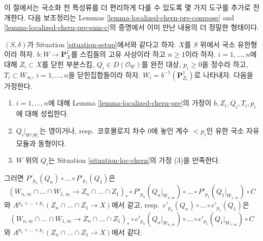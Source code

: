 \noindent
이 절에서는 국소화 천 특성류를 더 편리하게 다룰 수 있도록 몇 가지
도구를 추가로 전개한다. 다음 보조정리는 Lemmas
\ref{lemma-localized-chern-pre-compose} and
\ref{lemma-localized-chern-pre-sum-c}의 증명에서 이미 만난 내용의 더
정밀한 형태이다.

\begin{lemma}
\label{lemma-homomorphism-final}
$(S, \delta)$가 Situation \ref{situation-setup}에서와 같다고 하자.
$X$를 $S$ 위에서 국소 유한형이라 하자. $b : W \longrightarrow \mathbf{P}^1_X$를
스킴들의 고유 사상이라 하고 $n \geq 1$이라 하자.
$i = 1, \ldots, n$에 대해 $Z_i \subset X$를 닫힌 부분스킴,
$Q_i \in D(\mathcal{O}_W)$를 완전 대상, $p_i \geq 0$을 정수라 하고,
$T_i \subset W_\infty$, $i = 1, \ldots, n$을 닫힌집합들이라 하자.
$W_i = b^{-1}(\mathbf{P}^1_{Z_i})$로 나타내자. 다음을 가정한다.
\begin{enumerate}
\item $i = 1, \ldots, n$에 대해 Lemma
\ref{lemma-localized-chern-pre}의 가정이 $b, Z_i, Q_i, T_i, p_i$에 대해
성립한다.
\item $Q_i|_{W \setminus W_i}$는 영이거나, resp.\ 코호몰로지 차수 $0$에
놓인 계수 $< p_i$인 유한 국소 자유 모듈과 동형이다.
\item $W$ 위의 $Q_i$는 Situation \ref{situation-loc-chern}의 가정 (3)을
만족한다.
\end{enumerate}
그러면 $P'_{p_n}(Q_n) \circ \ldots \circ P'_{p_1}(Q_1)$은
$$
(W_{n, \infty} \cap \ldots \cap W_{1, \infty} \to
Z_n \cap \ldots \cap Z_1)_* \circ
P'_{p_n}(Q_n|_{W_{n, \infty}}) \circ \ldots \circ P'_{p_1}(Q_1|_{W_{1, \infty}})
\circ C
$$
와 $A^{p_n + \ldots + p_1}(Z_n \cap \ldots \cap Z_1 \to X)$에서 같고,
resp.\ $c'_{p_n}(Q_n) \circ \ldots \circ c'_{p_1}(Q_1)$은
$$
(W_{n, \infty} \cap \ldots \cap W_{1, \infty} \to
Z_n \cap \ldots \cap Z_1)_* \circ
c'_{p_n}(Q_n|_{W_{n, \infty}}) \circ \ldots \circ c'_{p_1}(Q_1|_{W_{1, \infty}})
\circ C
$$
와 $A^{p_n + \ldots + p_1}(Z_n \cap \ldots \cap Z_1 \to X)$에서 같다.
\end{lemma}

